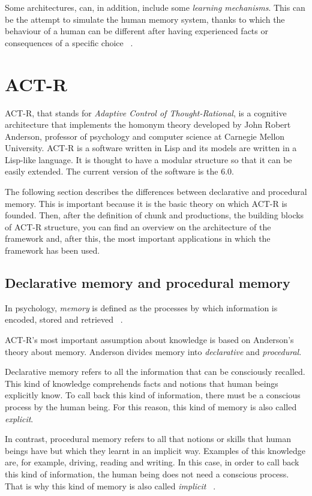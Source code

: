 	Some architectures, can, in addition, include some \emph{learning mechanisms}. This can be the attempt to simulate the human memory system, thanks to which the behaviour of a human can be different after having experienced facts or consequences of a specific choice ~\cite{Sears2012}.
	
	
  \section{ACT-R}
	\mbox{ACT-R}, that stands for \emph{Adaptive Control of Thought-Rational}, is a cognitive architecture that implements the homonym theory developed by John Robert Anderson, professor of psychology and computer science at Carnegie Mellon University. 
	\mbox{ACT-R} is a software written in Lisp and its models are written in a Lisp-like language. It is thought to have a modular structure so that it can be easily extended. The current version of the software is the 6.0. 
	
	The following section describes the differences between declarative and procedural memory. This is important because it is the basic theory on which ACT-R is founded. Then, after the definition of chunk and productions, the building blocks of ACT-R structure, you can find an overview on the architecture of the framework and, after this, the most important applications in which the framework has been used.
	
	\subsection{Declarative memory and procedural memory}
	In psychology, \emph{memory} is defined as the processes by which information is encoded, stored and retrieved ~\cite{baddeley2009memory}. 
	
	\mbox{ACT-R's} most important assumption about knowledge is based on Anderson's theory about memory. 
	Anderson divides memory into \emph{declarative} and \emph{procedural}. 
	
	Declarative memory refers to all the information that can be consciously recalled. This kind of knowledge comprehends facts and notions that human beings explicitly know. To call back this kind of information, there must be a conscious process by the human being. For this reason, this kind of memory is also called \emph{explicit}.
	
	In contrast, procedural memory refers to all that notions or skills that human beings have but which they learnt in an implicit way. Examples of this knowledge are, for example, driving, reading and writing. In this case, in order to call back this kind of information, the human being does not need a conscious process. That is why this kind of memory is also called \emph{implicit} ~\cite{anderson1976language}. 
	
